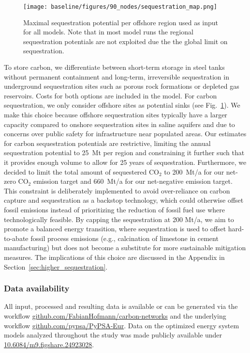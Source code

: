 \documentclass[twocolumn]{article}
\newcommand{\carbon}{CO$_2$}
\begin{document}

\begin{figure}[h!]
    \centering
    \texttt{[image: baseline/figures/90\_nodes/sequestration\_map.png]}
    \caption{Maximal sequestration potential per offshore region used as input for all models. Note that in most model runs the regional sequestration potentials are not exploited due the the global limit on sequestration.}
    \label{fig:sequestration_map}
\end{figure}

To store carbon, we differentiate between short-term storage in steel tanks without permanent containment and long-term, irreversible sequestration in underground sequestration sites such as porous rock formations or depleted gas reservoirs.
Costs for both options are included in the model.
For carbon sequestration, we only consider offshore sites as potential sinks (see Fig.~\ref{fig:sequestration_map}).
We make this choice because offshore sequestration sites typically have a larger capacity compared to onshore sequestration sites in saline aquifers and due to concerns over public safety for infrastructure near populated areas.
Our estimates for carbon sequestration potentials are restrictive, limiting the annual sequestration potential to 25~Mt per region and constraining it further such that it provides enough volume to allow for 25 years of sequestration.
Furthermore, we decided to limit the total amount of sequestered \carbon{} to 200~Mt/a for our net-zero \carbon{} emission target and 660~Mt/a for our net-negative emission target.
This constraint is deliberately implemented to avoid over-reliance on carbon capture and sequestration as a backstop technology, which could otherwise offset fossil emissions instead of prioritizing the reduction of fossil fuel use where technologically feasible. By capping the sequestration at 200 Mt/a, we aim to promote a balanced energy transition, where sequestration is used to offset hard-to-abate fossil process emissions (e.g., calcination of limestone in cement manufacturing) but does not become a substitute for more sustainable mitigation measures. The implications of this choice are discussed in the Appendix in Section~\ref{sec:higher_sequestration}.


\subsubsection*{Data availability}

All input, processed and resulting data is available or can be generated via the workflow \href{https://github.com/FabianHofmann/carbon-networks}{github.com/FabianHofmann/carbon-networks} and the underlying workflow \href{https://github.com/PyPSA/pypsa-eur}{github.com/pypsa/PyPSA-Eur}. Data on the optimized energy system models analyzed throughout the study was made publicly available under \href{https://doi.org/10.6084/m9.figshare.24923028}{10.6084/m9.figshare.24923028}.
\end{document}
